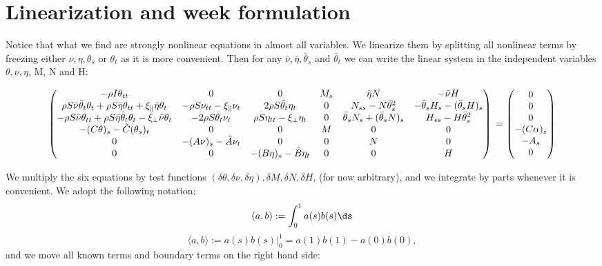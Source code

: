 
\usepackage{pdfsync}
\usepackage{amsmath}
\usepackage{graphicx}

\section{Linearization and week formulation}

Notice that what we find are strongly nonlinear equations in almost all variables.
We linearize them by splitting all nonlinear terms by freezing either $\nu, \eta, \theta_s$ or $\theta_t$ as it is more convenient. Then for any $\bar{\nu}, \bar{\eta}, \bar{\theta}_s$ and $\bar{\theta}_t$ we can write the linear system in the independent variables $\theta, \nu, \eta$, M, N and H:

\[\begin{pmatrix}
-\rho I \theta_{tt} & 0 & 0 & M_s & \bar{\eta}N & -\bar{\nu}H \\
\rho S\bar{\nu}\bar{\theta}_t\theta_t + \rho S \bar{\eta}\theta_{tt} + \xi_{\parallel}\bar{\eta}\theta_t & -\rho S \nu_{tt} -\xi_{\parallel}\nu_t & 2 \rho S\bar{\theta}_t\eta_t & 0 & N_{ss} - N\bar{\theta}_s^2 & -\bar{\theta}_s H_s - (\bar{\theta}_s H)_s \\
-\rho S \bar{\nu}\theta_{tt} + \rho S \bar{\eta}\bar{\theta}_t\theta_t - \xi_{\perp}\bar{\nu}\theta_t & - 2\rho S \bar{\theta}_t \nu_t & \rho S \eta_{tt} - \xi_{\perp}\eta_t & 0 & \bar{\theta}_s N_s + (\bar{\theta}_s N)_s & H_{ss}-H\bar{\theta}_s^2 \\
-(C\theta)_s -\tilde{C}(\theta_s)_t& 0 & 0 & M & 0 & 0 \\
0 & -(A\nu)_s -\tilde{A}\nu_t & 0 & 0 & N & 0 \\
0 & 0 & -(B\eta)_s - \tilde{B}\eta_t & 0 & 0 & H 
\end{pmatrix}
\\ =
\begin{pmatrix}
0\\
0\\
0\\
-(C\alpha)_s\\
-A_s\\
0
\end{pmatrix}\]

We multiply the six equations by test functions
$(\delta \theta, \delta\nu, \delta \eta), \delta M,\delta N, \delta H$, (for now arbitrary), and we integrate by parts whenever it is convenient. We adopt the following notation:
\[
(a,b) := \int_0^1 a(s) b(s) \ds
\]
\[
\langle a,b \rangle := a(s) b(s) \big|^1_0 = a(1)b(1)-a(0)b(0),
\]
and we move all known terms and boundary terms on the right hand side:

